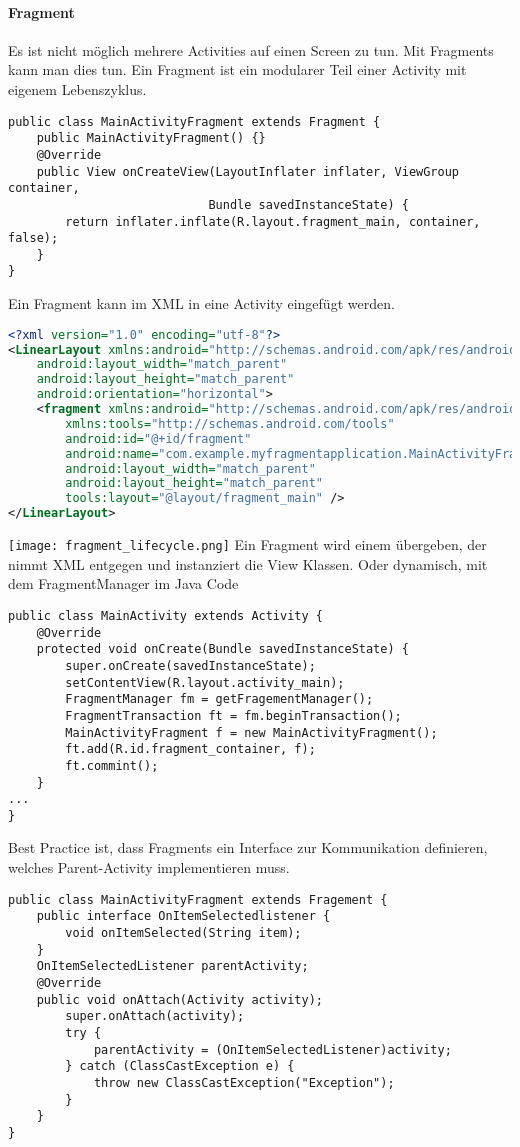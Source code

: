 \paragraph{Fragment} Es ist nicht möglich mehrere Activities auf einen Screen zu tun. Mit Fragments kann man dies tun. Ein Fragment ist ein modularer Teil einer Activity mit eigenem Lebenszyklus.
\begin{lstlisting}
public class MainActivityFragment extends Fragment {
    public MainActivityFragment() {}
    @Override
    public View onCreateView(LayoutInflater inflater, ViewGroup container,
                            Bundle savedInstanceState) {
        return inflater.inflate(R.layout.fragment_main, container, false);
    }
}
\end{lstlisting}
Ein Fragment kann im XML in eine Activity eingefügt werden.
\begin{lstlisting}[language=xml]
<?xml version="1.0" encoding="utf-8"?>
<LinearLayout xmlns:android="http://schemas.android.com/apk/res/android"
    android:layout_width="match_parent"
    android:layout_height="match_parent"
    android:orientation="horizontal">
    <fragment xmlns:android="http://schemas.android.com/apk/res/android"
        xmlns:tools="http://schemas.android.com/tools"
        android:id="@+id/fragment"
        android:name="com.example.myfragmentapplication.MainActivityFragment"
        android:layout_width="match_parent"
        android:layout_height="match_parent"
        tools:layout="@layout/fragment_main" />
</LinearLayout>
\end{lstlisting}
\texttt{[image: fragment\_lifecycle.png]}
Ein Fragment wird einem  übergeben, der nimmt XML entgegen und instanziert die View Klassen.
Oder dynamisch, mit dem FragmentManager im Java Code
\begin{lstlisting}
public class MainActivity extends Activity {
    @Override
    protected void onCreate(Bundle savedInstanceState) {
        super.onCreate(savedInstanceState);
        setContentView(R.layout.activity_main);
        FragmentManager fm = getFragementManager();
        FragmentTransaction ft = fm.beginTransaction();
        MainActivityFragment f = new MainActivityFragment();
        ft.add(R.id.fragment_container, f);
        ft.commint();
    }
...
}
\end{lstlisting}
Best Practice ist, dass Fragments ein Interface zur Kommunikation definieren, welches Parent-Activity implementieren muss.
\begin{lstlisting}
public class MainActivityFragment extends Fragement {
    public interface OnItemSelectedlistener {
        void onItemSelected(String item);
    }
    OnItemSelectedListener parentActivity;
    @Override
    public void onAttach(Activity activity);
        super.onAttach(activity);
        try {
            parentActivity = (OnItemSelectedListener)activity;
        } catch (ClassCastException e) {
            throw new ClassCastException("Exception");
        }
    }
}
\end{lstlisting}
